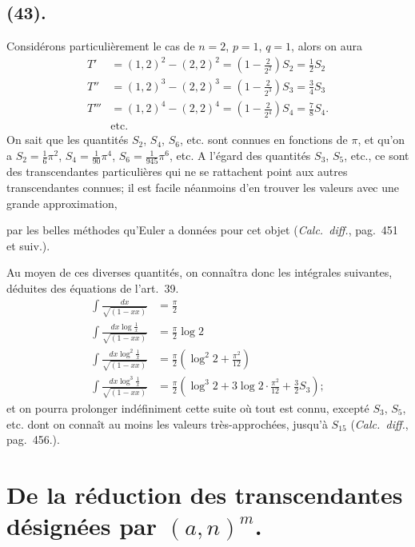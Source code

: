 \documentclass{article}
\begin{document}
\subsection*{(43).}

Considérons particulièrement le cas de $n=2$, $p=1$, $q=1$, alors on aura
\[ \begin{aligned} T'&=(1,2)^{2}-(2,2)^{2}=\left(1-\frac{2}{2^{2}}\right)S_{2}=\frac{1}{2}S_{2}\\ T''&=(1,2)^{3}-(2,2)^{3}=\left(1-\frac{2}{2^{3}}\right)S_{3}=\frac{3}{4}S_{3}\\ T'''&=(1,2)^{4}-(2,2)^{4}=\left(1-\frac{2}{2^{4}}\right)S_{4}=\frac{7}{8}S_{4}.\\ &\text{etc.} \end{aligned} \]
On sait que les quantités $S_{2}$, $S_{4}$, $S_{6}$, etc. sont connues en fonctions de $\pi$, et qu'on a $S_{2}=\frac{1}{6}\pi^{2}$, $S_{4}=\frac{1}{90}\pi^{4}$, $S_{6}=\frac{1}{945}\pi^{6}$, etc. A l'égard des quantités $S_{3}$, $S_{5}$, etc., ce sont des transcendantes particulières qui ne se rattachent point aux autres transcendantes connues; il est facile néanmoins d'en trouver les valeurs avec une grande approximation,

par les belles méthodes qu'Euler a données pour cet objet (\emph{Calc.\ diff.}, pag.\ 451 et suiv.).

Au moyen de ces diverses quantités, on connaîtra donc les intégrales suivantes, déduites des équations de l'art.\ 39.
\[ \begin{aligned} \int\frac{dx}{\sqrt{(1-xx)}}&=\frac{\pi}{2}\\ \int\frac{dx\log\frac{1}{x}}{\sqrt{(1-xx)}}&=\frac{\pi}{2}\log 2\\ \int\frac{dx\log^{2}\frac{1}{x}}{\sqrt{(1-xx)}}&=\frac{\pi}{2}\left(\log^{2}2+\frac{\pi^{2}}{12}\right)\\ \int\frac{dx\log^{3}\frac{1}{x}}{\sqrt{(1-xx)}}&=\frac{\pi}{2}\left(\log^{3}2+3\log 2\cdot\frac{\pi^{2}}{12}+\frac{3}{2}S_{3}\right); \end{aligned} \]
et on pourra prolonger indéfiniment cette suite où tout est connu, excepté $S_{3}$, $S_{5}$, etc. dont on connaît au moins les valeurs très-approchées, jusqu'à $S_{15}$ (\emph{Calc.\ diff.}, pag.\ 456.).

\section*{De la réduction des transcendantes désignées par $(a,n)^{m}$.}
\end{document}
